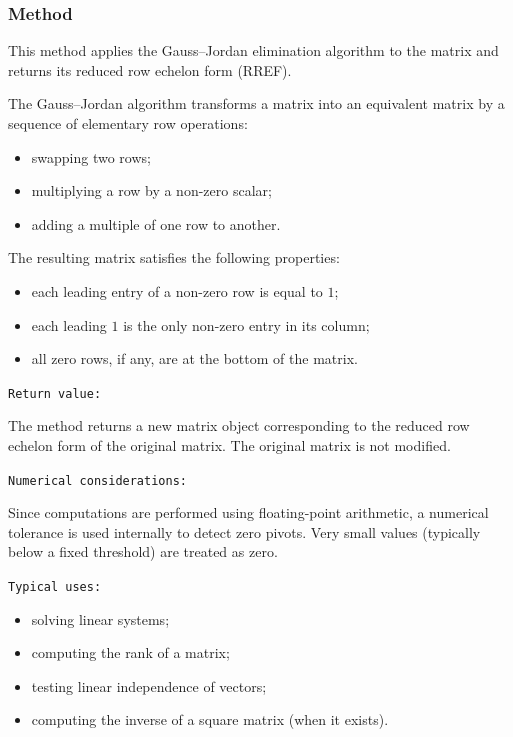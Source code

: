 \subsubsection{Method }
\label{ssub:method_matrix_gauss_jordan}


This method applies the Gauss–Jordan elimination algorithm to the matrix and returns its reduced row echelon form (RREF).

\medskip
The Gauss–Jordan algorithm transforms a matrix into an equivalent matrix by a sequence of elementary row operations:
\begin{itemize}
\item swapping two rows;
\item multiplying a row by a non-zero scalar;
\item adding a multiple of one row to another.
\end{itemize}
The resulting matrix satisfies the following properties:
\begin{itemize}
\item each leading entry of a non-zero row is equal to $1$;
\item each leading $1$ is the only non-zero entry in its column;
\item all zero rows, if any, are at the bottom of the matrix.
\end{itemize}

\medskip
\texttt{Return value: }

The method returns a new matrix object corresponding to the reduced row echelon form of the original matrix.
The original matrix is not modified.

\medskip
\texttt{Numerical considerations: }

Since computations are performed using floating-point arithmetic, a numerical tolerance is used internally to detect zero pivots.
Very small values (typically below a fixed threshold) are treated as zero.

\medskip
\texttt{Typical uses: }

\begin{itemize}
\item solving linear systems;
\item computing the rank of a matrix;
\item testing linear independence of vectors;
\item computing the inverse of a square matrix (when it exists).
\end{itemize}

